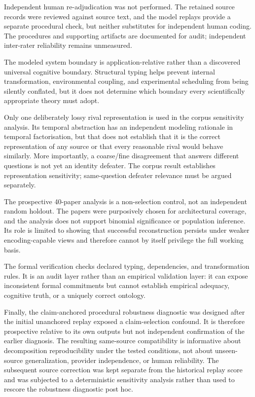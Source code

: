\documentclass[11pt]{article}
\begin{document}
Independent human re-adjudication was not performed. The retained source records were reviewed against source text, and the model replays provide a separate procedural check, but neither substitutes for independent human coding. The procedures and supporting artifacts are documented for audit; independent inter-rater reliability remains unmeasured.

The modeled system boundary is application-relative rather than a discovered universal cognitive boundary. Structural typing helps prevent internal transformation, environmental coupling, and experimental scheduling from being silently conflated, but it does not determine which boundary every scientifically appropriate theory must adopt.

Only one deliberately lossy rival representation is used in the corpus sensitivity analysis. Its temporal abstraction has an independent modeling rationale in temporal factorisation, but that does not establish that it is the correct representation of any source or that every reasonable rival would behave similarly. More importantly, a coarse/fine disagreement that answers different questions is not yet an identity defeater. The corpus result establishes representation sensitivity; same-question defeater relevance must be argued separately.

The prospective 40-paper analysis is a non-selection control, not an independent random holdout. The papers were purposively chosen for architectural coverage, and the analysis does not support binomial significance or population inference. Its role is limited to showing that successful reconstruction persists under weaker encoding-capable views and therefore cannot by itself privilege the full working basis.

The formal verification checks declared typing, dependencies, and transformation rules. It is an audit layer rather than an empirical validation layer: it can expose inconsistent formal commitments but cannot establish empirical adequacy, cognitive truth, or a uniquely correct ontology.

Finally, the claim-anchored procedural robustness diagnostic was designed after the initial unanchored replay exposed a claim-selection confound. It is therefore prospective relative to its own outputs but not independent confirmation of the earlier diagnosis. The resulting same-source compatibility is informative about decomposition reproducibility under the tested conditions, not about unseen-source generalization, provider independence, or human reliability. The subsequent source correction was kept separate from the historical replay score and was subjected to a deterministic sensitivity analysis rather than used to rescore the robustness diagnostic post hoc.
\end{document}
